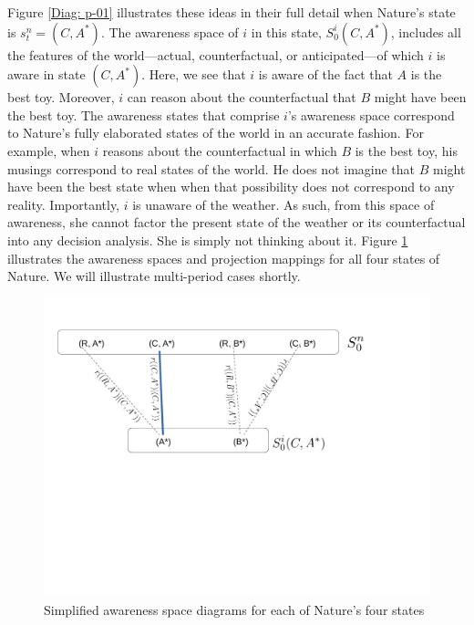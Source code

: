 \documentclass[
11pt,
titlepage,
reqno,
]{article}%
\theoremstyle{definition}
\begin{document}
	Figure \ref{Diag: p-01} illustrates these ideas in their full detail when Nature's state is $s^n_t=(C,A^\ast)$. The awareness space of $i$ in this state, $S^i_0(C,A^\ast)$, includes all the features of the world---actual, counterfactual, or anticipated---of which $i$ is aware in state $(C,A^\ast)$. Here, we see that $i$ is aware of the fact that $A$ is the best toy. Moreover, $i$ can reason about the counterfactual that $B$ might have been the best toy. The awareness states that comprise $i$'s awareness space correspond to Nature's fully elaborated states of the world in an accurate fashion. For example, when $i$ reasons about the counterfactual in which $B$ is the best toy, his musings correspond to real states of the world. He does not imagine that $B$ might have been the best state when when that possibility does not correspond to any reality. Importantly, $i$ is unaware of the weather. As such, from this space of awareness, she cannot factor the present state of the weather or its counterfactual into any decision analysis. She is simply not thinking about it. Figure \ref{Diag: p-02} illustrates the awareness spaces and projection mappings for all four states of Nature. We will illustrate multi-period cases shortly.
	
	\begin{figure}[h!]
		\centering
		\includegraphics*[page=2,trim = 0in 0in 0in 0in,scale=.6]{Awareness_Diagrams_All}
		\caption{Simplified awareness space diagrams for each of Nature's four states\label{Diag: p-02}}%
	\end{figure}
\end{document}

